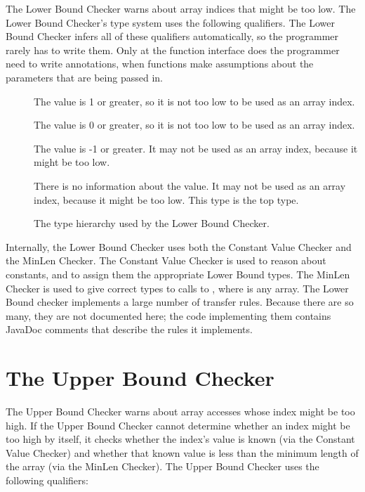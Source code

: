 The Lower Bound Checker warns about array indices that might be
too low.  The
Lower Bound Checker's type system uses the following qualifiers.
The Lower Bound Checker infers all of these qualifiers automatically,
so the programmer rarely has to write them. Only at the function interface
does the programmer need to write annotations, when functions make assumptions
about the parameters that are being passed in.

\begin{description}
\item[]
  The value is 1 or greater, so it is not too low to be used as an array index.
\item[]
  The value is 0 or greater, so it is not too low to be used as an array index.
\item[]
  The value is -1 or greater.
  It may not be used as an array index, because it might be too low.
\item[]
  There is no information about the value.
  It may not be used as an array index, because it might be too low.
  This type is the top type.
\end{description}

\begin{figure}
  \caption{The type hierarchy used by the Lower Bound Checker.}
  \label{fig-lowerbound-types}
\end{figure}

Internally, the Lower Bound Checker uses both the Constant Value Checker and the MinLen
Checker. The Constant Value Checker is used to reason about constants, and to assign
them the appropriate Lower Bound types. The MinLen Checker is used to give correct types
to calls to , where  is any array. The Lower Bound checker
implements a large number of transfer rules. Because there are so many, they are
not documented here; the code implementing them contains JavaDoc comments that describe
the rules it implements.

\section{The Upper Bound Checker\label{index-upperbound}}

The Upper Bound Checker warns about array accesses whose index might be
too high. If the Upper Bound Checker cannot determine whether an index might
be too high by itself, it checks whether the index's value is known (via the Constant
Value Checker) and whether that known value is less than the minimum length of the
array (via the MinLen Checker). The Upper Bound Checker uses the following
qualifiers:

